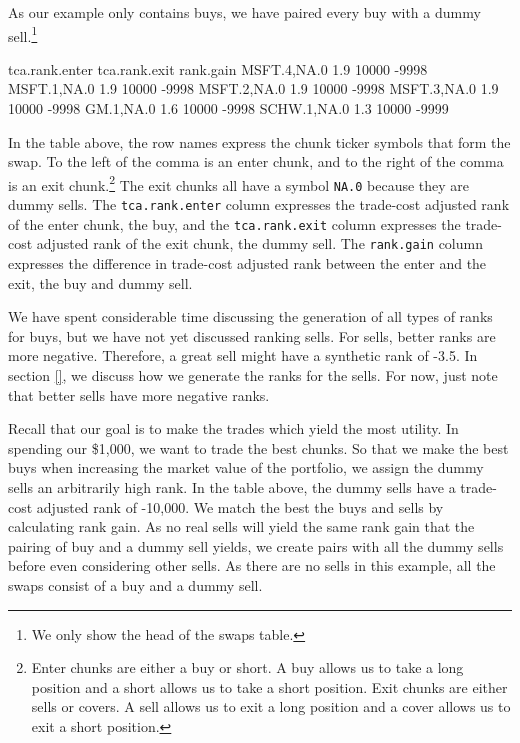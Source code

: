 \documentclass{article}
\begin{document}
As our example only contains buys, we have paired every buy with a
dummy sell.\protect\footnote{We only show the head of the swaps table.}

\begin{Schunk}
\begin{Soutput}
            tca.rank.enter tca.rank.exit rank.gain
MSFT.4,NA.0            1.9         10000     -9998
MSFT.1,NA.0            1.9         10000     -9998
MSFT.2,NA.0            1.9         10000     -9998
MSFT.3,NA.0            1.9         10000     -9998
GM.1,NA.0              1.6         10000     -9998
SCHW.1,NA.0            1.3         10000     -9999
\end{Soutput}
\end{Schunk}

In the table above, the row names express the chunk ticker symbols
that form the swap.  To the left of the comma is an enter chunk, and
to the right of the comma is an exit chunk.\protect\footnote{Enter
chunks are either a buy or short.  A buy allows us to take a long
position and a short allows us to take a short position.  Exit chunks
are either sells or covers.  A sell allows us to exit a long position
and a cover allows us to exit a short position.}  The exit chunks all
have a symbol \texttt{NA.0} because they are dummy sells.  The
\texttt{tca.rank.enter} column expresses the trade-cost adjusted rank
of the enter chunk, the buy, and the \texttt{tca.rank.exit} column
expresses the trade-cost adjusted rank of the exit chunk, the dummy
sell.  The \texttt{rank.gain} column expresses the difference in
trade-cost adjusted rank between the enter and the exit, the buy and
dummy sell.  

We have spent considerable time discussing the generation of all types
of ranks for buys, but we have not yet discussed ranking sells.  For
sells, better ranks are more negative.  Therefore, a great sell might
have a synthetic rank of -3.5.  In section \ref{}, we discuss how
we generate the ranks for the sells.  For now, just note that better
sells have more negative ranks.

Recall that our goal is to make the trades which yield the most
utility.  In spending our \$1,000, we want to trade the best chunks.
So that we make the best buys when increasing the market value of the
portfolio, we assign the dummy sells an arbitrarily high rank.  In the
table above, the dummy sells have a trade-cost adjusted rank of
-10,000.  We match the best the buys and sells by calculating rank
gain.  As no real sells will yield the same rank gain that the pairing
of buy and a dummy sell yields, we create pairs with all the dummy
sells before even considering other sells.  As there are no sells in
this example, all the swaps consist of a buy and a dummy sell.
\end{document}
